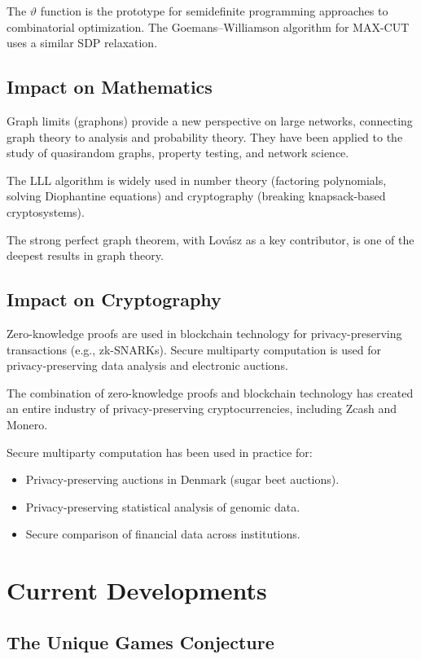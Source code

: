 The $\vartheta$ function is the prototype for semidefinite programming approaches to combinatorial optimization. The Goemans--Williamson algorithm for MAX-CUT uses a similar SDP relaxation.

\subsection{Impact on Mathematics}

Graph limits (graphons) provide a new perspective on large networks, connecting graph theory to analysis and probability theory. They have been applied to the study of quasirandom graphs, property testing, and network science.

The LLL algorithm is widely used in number theory (factoring polynomials, solving Diophantine equations) and cryptography (breaking knapsack-based cryptosystems).

The strong perfect graph theorem, with Lov\'asz as a key contributor, is one of the deepest results in graph theory.

\subsection{Impact on Cryptography}

Zero-knowledge proofs are used in blockchain technology for privacy-preserving transactions (e.g., zk-SNARKs). Secure multiparty computation is used for privacy-preserving data analysis and electronic auctions.

The combination of zero-knowledge proofs and blockchain technology has created an entire industry of privacy-preserving cryptocurrencies, including Zcash and Monero.

Secure multiparty computation has been used in practice for:
\begin{itemize}
\item Privacy-preserving auctions in Denmark (sugar beet auctions).
\item Privacy-preserving statistical analysis of genomic data.
\item Secure comparison of financial data across institutions.
\end{itemize}

\section{Current Developments}

\subsection{The Unique Games Conjecture}

